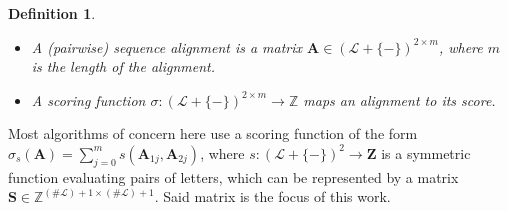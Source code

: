 \documentclass{article}
\newtheorem{definition}{Definition}
\begin{document}
\begin{multicols}{2}
\begin{definition}
\begin{itemize}
        \item A (pairwise) \emph{sequence alignment} is a matrix $\mathbf A \in
                  (\mathcal{L} + \{\mathtt{-}\})^{2 \times m}$, where $m$ is the
              length
              of the alignment.
      \item A scoring function $\sigma: (\mathcal{L} + \{\mathtt{-}\})^{2
                      \times m} \to \mathbb{Z}$ maps an alignment to its score.
    \end{itemize}
\end{definition}

Most algorithms of concern here use a scoring function of the form
$\sigma_s( \mathbf A )= \sum_{j=0}^m s(\mathbf A_{1j}, \mathbf A_{2j})$, where $s:
    (\mathcal L + \{\mathtt{-}\})^2 \to \mathbf{Z}$ is a symmetric function
evaluating pairs of letters, which can be represented by a matrix $\mathbf S
    \in \mathbb Z^{(\# \mathcal L) + 1 \times (\# \mathcal L) + 1}$. Said matrix is
the focus of this work.


\end{multicols}
\end{document}
